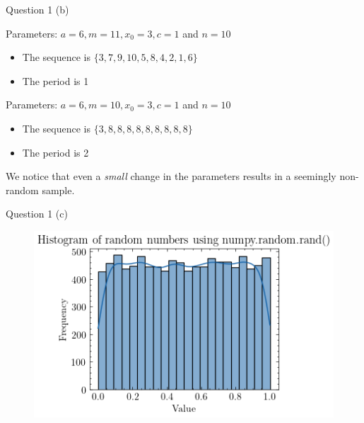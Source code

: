 \documentclass[compress,12pt]{beamer}
\begin{document}
\begin{frame}{Question 1 (b)}

      Parameters: $a = 6, m = 11, x_0 = 3, c = 1$ and $n=10$
      \begin{itemize}
            \item The sequence is $\{3, 7, 9, 10, 5, 8, 4, 2, 1, 6\}$
            \item The period is 1
      \end{itemize}

      Parameters: $a = 6, m = 10, x_0 = 3, c = 1$ and $n=10$
      \begin{itemize}
            \item The sequence is $\{3, 8, 8, 8, 8, 8, 8, 8, 8, 8\}$
            \item The period is 2
      \end{itemize}
    \begin{tcolorbox}
    We notice that even a \emph{small} change in the parameters results in a seemingly non-random sample.
      \end{tcolorbox}
\end{frame}

\begin{frame}{Question 1 (c)}
      \begin{figure}
            \centering
            \includegraphics[scale=0.7]{imgs/1d.png}
      \end{figure}
\end{frame}
\end{document}
